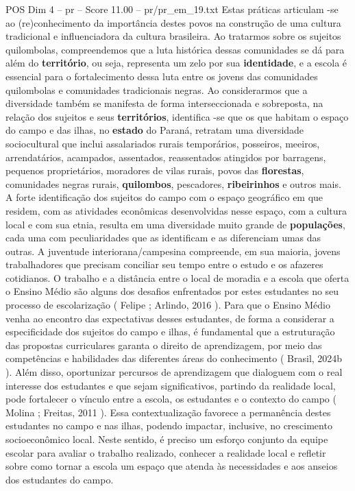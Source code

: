 \begin{textsample}{POS Dim 4 – pr – Score 11.00 – pr/pr\_em\_19.txt}
Estas práticas articulam -se ao (re)conhecimento da importância destes povos na construção de uma cultura tradicional e influenciadora da cultura brasileira.
Ao tratarmos sobre os sujeitos quilombolas, compreendemos que a luta histórica dessas comunidades se dá para além do \textbf{território}, ou seja, representa um zelo por sua \textbf{identidade}, e a escola é essencial para o fortalecimento dessa luta entre os jovens das comunidades quilombolas e comunidades tradicionais negras.
Ao considerarmos que a diversidade também se manifesta de forma interseccionada e sobreposta, na relação dos sujeitos e seus \textbf{territórios}, identifica -se que os que habitam o espaço do campo e das ilhas, no \textbf{estado} do Paraná, retratam uma diversidade sociocultural que inclui assalariados rurais temporários, posseiros, meeiros, arrendatários, acampados, assentados, reassentados atingidos por barragens, pequenos proprietários, moradores de vilas rurais, povos das \textbf{florestas}, comunidades negras rurais, \textbf{quilombos}, pescadores, \textbf{ribeirinhos} e outros mais.
A forte identificação dos sujeitos do campo com o espaço geográfico em que residem, com as atividades econômicas desenvolvidas nesse espaço, com a cultura local e com sua etnia, resulta em uma diversidade muito grande de \textbf{populações}, cada uma com peculiaridades que as identificam e as diferenciam umas das outras.
A juventude interiorana/campesina compreende, em sua maioria, jovens trabalhadores que precisam conciliar seu tempo entre o estudo e os afazeres cotidianos.
O trabalho e a distância entre o local de moradia e a escola que oferta o Ensino Médio são alguns dos desafios enfrentados por estes estudantes no seu processo de escolarização ( Felipe ; Arlindo, 2016 ).
Para que o Ensino Médio venha ao encontro das expectativas desses estudantes, de forma a considerar a especificidade dos sujeitos do campo e ilhas, é fundamental que a estruturação das propostas curriculares garanta o direito de aprendizagem, por meio das competências e habilidades das diferentes áreas do conhecimento ( Brasil, 2024b ).
Além disso, oportunizar percursos de aprendizagem que dialoguem com o real interesse dos estudantes e que sejam significativos, partindo da realidade local, pode fortalecer o vínculo entre a escola, os estudantes e o contexto do campo ( Molina ; Freitas, 2011 ).
Essa contextualização favorece a permanência destes estudantes no campo e nas ilhas, podendo impactar, inclusive, no crescimento socioeconômico local.
Neste sentido, é preciso um esforço conjunto da equipe escolar para avaliar o trabalho realizado, conhecer a realidade local e refletir sobre como tornar a escola um espaço que atenda às necessidades e aos anseios dos estudantes do campo.

\end{textsample}

